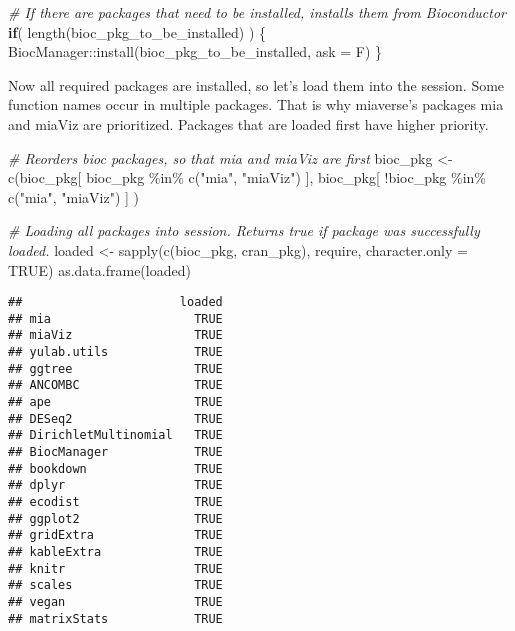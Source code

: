 \documentclass[
  oneside]{book}
\newenvironment{Shaded}{\begin{snugshade}}{\end{snugshade}}
\newcommand{\AttributeTok}[1]{\textcolor[rgb]{0.77,0.63,0.00}{#1}}
\newcommand{\CommentTok}[1]{\textcolor[rgb]{0.56,0.35,0.01}{\textit{#1}}}
\newcommand{\ConstantTok}[1]{\textcolor[rgb]{0.00,0.00,0.00}{#1}}
\newcommand{\ControlFlowTok}[1]{\textcolor[rgb]{0.13,0.29,0.53}{\textbf{#1}}}
\newcommand{\FunctionTok}[1]{\textcolor[rgb]{0.00,0.00,0.00}{#1}}
\newcommand{\NormalTok}[1]{#1}
\newcommand{\OtherTok}[1]{\textcolor[rgb]{0.56,0.35,0.01}{#1}}
\newcommand{\SpecialCharTok}[1]{\textcolor[rgb]{0.00,0.00,0.00}{#1}}
\newcommand{\StringTok}[1]{\textcolor[rgb]{0.31,0.60,0.02}{#1}}
\begin{document}
\begin{Shaded}
\begin{Highlighting}[]
\CommentTok{\# If there are packages that need to be installed, installs them from Bioconductor}
\ControlFlowTok{if}\NormalTok{( }\FunctionTok{length}\NormalTok{(bioc\_pkg\_to\_be\_installed) ) \{}
\NormalTok{   BiocManager}\SpecialCharTok{::}\FunctionTok{install}\NormalTok{(bioc\_pkg\_to\_be\_installed, }\AttributeTok{ask =}\NormalTok{ F)}
\NormalTok{\}}
\end{Highlighting}
\end{Shaded}

Now all required packages are installed, so let's load them into the session.
Some function names occur in multiple packages. That is why miaverse's packages
mia and miaViz are prioritized. Packages that are loaded first have higher priority.

\begin{Shaded}
\begin{Highlighting}[]
\CommentTok{\# Reorders bioc packages, so that mia and miaViz are first}
\NormalTok{bioc\_pkg }\OtherTok{\textless{}{-}} \FunctionTok{c}\NormalTok{(bioc\_pkg[ bioc\_pkg }\SpecialCharTok{\%in\%} \FunctionTok{c}\NormalTok{(}\StringTok{"mia"}\NormalTok{, }\StringTok{"miaViz"}\NormalTok{) ], }
\NormalTok{              bioc\_pkg[ }\SpecialCharTok{!}\NormalTok{bioc\_pkg }\SpecialCharTok{\%in\%} \FunctionTok{c}\NormalTok{(}\StringTok{"mia"}\NormalTok{, }\StringTok{"miaViz"}\NormalTok{) ] ) }

\CommentTok{\# Loading all packages into session. Returns true if package was successfully loaded.}
\NormalTok{loaded }\OtherTok{\textless{}{-}} \FunctionTok{sapply}\NormalTok{(}\FunctionTok{c}\NormalTok{(bioc\_pkg, cran\_pkg), require, }\AttributeTok{character.only =} \ConstantTok{TRUE}\NormalTok{)}
\FunctionTok{as.data.frame}\NormalTok{(loaded)}
\end{Highlighting}
\end{Shaded}

\begin{verbatim}
##                      loaded
## mia                    TRUE
## miaViz                 TRUE
## yulab.utils            TRUE
## ggtree                 TRUE
## ANCOMBC                TRUE
## ape                    TRUE
## DESeq2                 TRUE
## DirichletMultinomial   TRUE
## BiocManager            TRUE
## bookdown               TRUE
## dplyr                  TRUE
## ecodist                TRUE
## ggplot2                TRUE
## gridExtra              TRUE
## kableExtra             TRUE
## knitr                  TRUE
## scales                 TRUE
## vegan                  TRUE
## matrixStats            TRUE
\end{verbatim}
\end{document}
